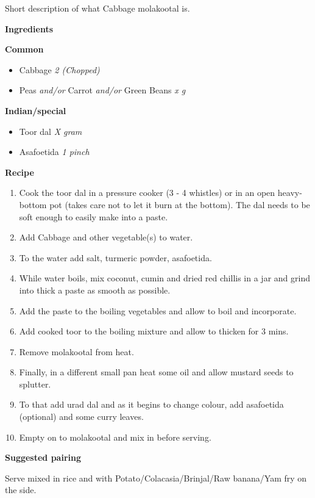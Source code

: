 Short description of what Cabbage molakootal is.

\large{\textbf{Ingredients}}
\begin{multicols}{2}
  \large{\textbf{Common}}
  \begin{itemize}
    \item Cabbage \hfill \textit{2 (Chopped)}
    \item Peas \textit{and/or} Carrot \textit{and/or} Green Beans \hfill \textit{x g}
  \end{itemize}
  \columnbreak
  \large{\textbf{Indian/special}}
  \begin{itemize}
    \item Toor dal \hfill \textit{X gram}
    \item Asafoetida \hfill \textit{1 pinch}
  \end{itemize}
\end{multicols}

\large{\textbf{Recipe}}

\begin{enumerate}
  \item Cook the toor dal in a pressure cooker (3 - 4 whistles) or in an open heavy-bottom pot (takes care not to let it burn at the bottom). The dal needs to be soft enough to easily make into a paste.
  \item Add Cabbage and other vegetable(s) to water.
  \item To the water add salt, turmeric powder, asafoetida.
  \item While water boils, mix coconut, cumin and dried red chillis in a jar and grind into thick a paste as smooth as possible.
  \item Add the paste to the boiling vegetables and allow to boil and incorporate.
  \item Add cooked toor to the boiling mixture and allow to thicken for 3 mins.
  \item Remove molakootal from heat.
  \item Finally, in a different small pan heat some oil and allow mustard seeds to splutter.
  \item To that add urad dal and as it begins to change colour, add asafoetida (optional) and some curry leaves.
  \item Empty on to molakootal and mix in before serving.
\end{enumerate}

\large{\textbf{Suggested pairing}}

Serve mixed in rice and with Potato/Colacasia/Brinjal/Raw banana/Yam fry on the side.
